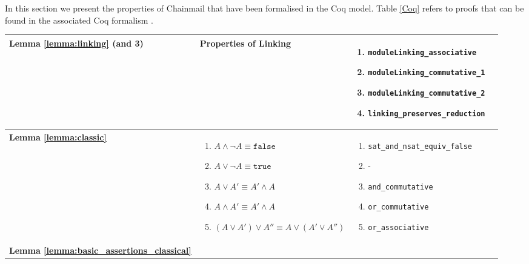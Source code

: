  In this section we present the properties of Chainmail that have been formalised in the Coq model. Table \ref{Coq} refers to proofs that can be found in the associated Coq formalism \cite{coq}.

\begin{table}
  \begin{tabular}{|l|l|l|l|}
    \hline

\textbf{Lemma \ref{lemma:linking} (and 3)} &
Properties of Linking
        & 
\parbox{.45\textwidth}{\scriptsize\begin{enumerate}[label={(\arabic*)}]
            \item \texttt{moduleLinking\_associative}
            \item \texttt{moduleLinking\_commutative\_1}
            \item \texttt{moduleLinking\_commutative\_2}
            \item \texttt{linking\_preserves\_reduction}
        \end{enumerate}}
        \\
\hline
\textbf{Lemma \ref{lemma:classic}} &   
\parbox{.45\textwidth}{\scriptsize\begin{enumerate}[label={(\arabic*)}]
            \item $A \wedge \neg A \equiv \texttt{false}$
            \item $A \vee \neg A \equiv \texttt{true}$
            \item $A \vee A' \equiv A' \wedge A$
            \item $A \wedge A' \equiv A' \wedge A$
            \item $(A \vee A') \vee A'' \equiv A \vee (A' \vee A'')$
        \end{enumerate}}
        & 
\parbox{.45\textwidth}{\scriptsize\begin{enumerate}[label={(\arabic*)}]
            \item \texttt{sat\_and\_nsat\_equiv\_false}
            \item -
            \item \texttt{and\_commutative}
            \item \texttt{or\_commutative}
            \item \texttt{or\_associative}
        \end{enumerate}}
        \\
\hline
\textbf{Lemma \ref{lemma:basic_assertions_classical}} &   
\parbox{.45\textwidth}{\scriptsize\begin{enumerate}[label={(\arabic*)}]

\end{enumerate}}
\end{tabular}
\end{table}

